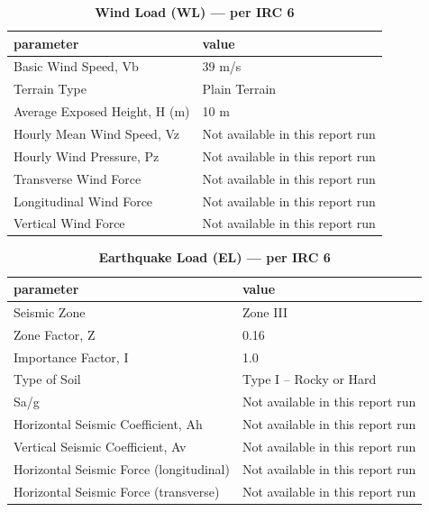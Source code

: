 \documentclass[12pt,a4paper]{report}
\numberwithin{table}{chapter}
\numberwithin{figure}{chapter}
\begin{document}
\vspace{1em}
\begin{longtable}{|L{5.5cm}|p{10.0cm}|}
\caption{\textbf{Wind Load (WL) --- per IRC 6}}\\
\hline
\textbf{parameter} & \textbf{value} \\
\hline
\textnormal{Basic Wind Speed, Vb} & 39 m/s \\[6pt]
\hline
\textnormal{Terrain Type} & Plain Terrain \\[6pt]
\hline
\textnormal{Average Exposed Height, H (m)} & 10 m \\[6pt]
\hline
\textnormal{Hourly Mean Wind Speed, Vz} & Not available in this report run \\[6pt]
\hline
\textnormal{Hourly Wind Pressure, Pz} & Not available in this report run \\[6pt]
\hline
\textnormal{Transverse Wind Force} & Not available in this report run \\[6pt]
\hline
\textnormal{Longitudinal Wind Force} & Not available in this report run \\[6pt]
\hline
\textnormal{Vertical Wind Force} & Not available in this report run \\[6pt]
\hline
\end{longtable}

\vspace{1em}
\begin{longtable}{|L{5.5cm}|p{10.0cm}|}
\caption{\textbf{Earthquake Load (EL) --- per IRC 6}}\\
\hline
\textbf{parameter} & \textbf{value} \\
\hline
\textnormal{Seismic Zone} & Zone III \\[6pt]
\hline
\textnormal{Zone Factor, Z} & 0.16 \\[6pt]
\hline
\textnormal{Importance Factor, I} & 1.0 \\[6pt]
\hline
\textnormal{Type of Soil} & Type I – Rocky or Hard \\[6pt]
\hline
\textnormal{Sa/g} & Not available in this report run \\[6pt]
\hline
\textnormal{Horizontal Seismic Coefficient, Ah} & Not available in this report run \\[6pt]
\hline
\textnormal{Vertical Seismic Coefficient, Av} & Not available in this report run \\[6pt]
\hline
\textnormal{Horizontal Seismic Force (longitudinal)} & Not available in this report run \\[6pt]
\hline
\textnormal{Horizontal Seismic Force (transverse)} & Not available in this report run \\[6pt]
\hline
\end{longtable}
\end{document}
